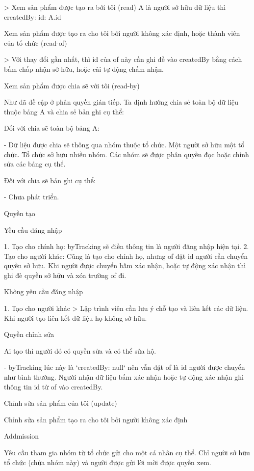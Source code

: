 \documentclass{report}
\begin{document}
> Xem sản phẩm được tạo ra bởi tôi (read) A là người sở hữu dữ liệu thì createdBy: { id: A.id }

Xem sản phẩm được tạo ra cho tôi bởi người không xác định, hoặc thành viên của tổ chức (read-of)


> Với thay đổi gần nhất, thì id của of này cần ghi đề vào createdBy bằng cách bấm chấp nhận sở hữu, hoặc cài tự động chấm nhận.

Xem sản phẩm được chia sẽ với tôi (read-by)

Như đã đề cập ở phân quyền gián tiếp. Ta định hướng chia sẻ toàn bộ dữ liệu thuộc bảng A và chia sẻ bản ghi cụ thể:

Đối với chia sẽ toàn bộ bảng A:

- Dữ liệu được chia sẽ thông qua nhóm thuộc tổ chức.
Một người sở hữu một tổ chức. Tổ chức sở hữu nhiều nhóm.
Các nhóm sẽ được phân quyền đọc hoặc chỉnh sửa các bảng cụ thể.

Đối với chia sẽ bản ghi cụ thể:

- Chưa phát triển.

Quyền tạo

Yều cầu đăng nhập

1. Tạo cho chính họ:
byTracking sẽ điền thông tin là người đăng nhập hiện tại.
2. Tạo cho người khác:
Cũng là tạo cho chính họ, nhưng of đặt id người cần chuyển quyền sở hữu. Khi người được chuyển bấm xác nhận, hoặc tự động xác nhận thì ghi đè quyền sở hữu và xóa trường of đi.

Không yêu cầu đăng nhập

1. Tạo cho người khác
> Lập trình viên cần lưu ý chỗ tạo và liên kết các dữ liệu. Khi người tạo liên kết dữ liệu họ không sở hữu.

Quyền chỉnh sửa

Ai tạo thì người đó có quyền sửa và có thể sửa hộ.

- byTracking lúc này là `createdBy: null` nên vẫn đặt of là id người được chuyển như bình thường. Người nhận dữ liệu bấm xác nhận hoặc tự động xác nhận ghi thông tin id từ of vào createdBy.

Chỉnh sửa sản phẩm của tôi (update)

Chỉnh sửa sản phẩm tạo ra cho tôi bởi người không xác định



Addmission

Yêu cầu tham gia nhóm từ tổ chức gửi cho một cá nhân cụ thể. Chỉ người sở hữu tổ chức (chứa nhóm này) và người được gửi
lời mời được quyền xem.
\end{document}
